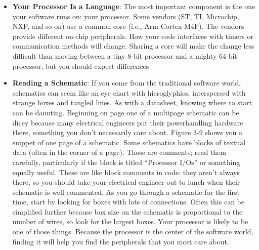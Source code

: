 \documentclass{report}
\begin{document}
\begin{itemize}
            \bigbreak \noindent 
            Other resources may also be available as you work with peripherals:
            \begin{itemize}
                \item If the chip has a user manual, be sure to look at that.
                \item Application notes often have specific use cases that may be of interest. These often have vendor example code associated with them. Also look for a vendor code repository.
                \item Search the part on GitHub or the web. Example code from other folks using the part can show you what you should be doing.
            \end{itemize}
        \item \textbf{Your Processor Is a Language}: The most important component is the one your software runs on: your processor.
            \bigbreak \noindent 
            Some vendors (ST, TI, Microchip, NXP, and so on) use a common core (i.e., Arm Cortex-M4F). The vendors provide different on-chip peripherals. How your code interfaces with timers or communication methods will change. Sharing a core will make the change less difficult than moving between a tiny 8-bit processor and a mighty 64-bit processor, but you should expect differences
        \item \textbf{Reading a Schematic}: If you come from the traditional software world, schematics can seem like an eye chart with hieroglyphics, interspersed with strange boxes and tangled lines. As with a datasheet, knowing where to start can be daunting. Beginning on page one of a multipage schematic can be dicey because many electrical engineers put their powerhandling hardware there, something you don’t necessarily care about. Figure 3-9 shows you a snippet of one page of a schematic.
            \bigbreak \noindent 
            Some schematics have blocks of textual data (often in the corner of a page). Those are comments; read them carefully, particularly if the block is titled “Processor I/Os” or something equally useful. These are like block comments in code: they aren’t always there, so you should take your electrical engineer out to lunch when their schematic is well commented.
            \bigbreak \noindent 
            \bigbreak \noindent 
            As you go through a schematic for the first time, start by looking for boxes with lots of connections. Often this can be simplified further because box size on the schematic is proportional to the number of wires, so look for the largest boxes. Your processor is likely to be one of those things. Because the processor is the center of the software world, finding it will help you find the peripherals that you most care about.




    \end{itemize}
\end{document}

